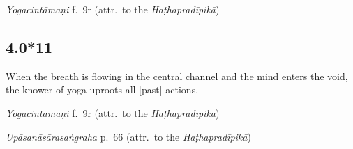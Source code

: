 \begin{ekdosis}

\begin{testimonia}[hp04_000_10]
\emph{Yogacintāmaṇi} f.~9r (attr.~to the \emph{Haṭhapradīpikā})
\begin{versinnote}
\end{versinnote}
\end{testimonia}



\subsection*{4.0*11}
\begin{translation}[hp04_000_11]
When the breath is flowing in the central channel and the mind enters the void, the knower of yoga uproots all [past] actions.
\end{translation}

\begin{sources}[hp04_000_11]
\end{sources}

\begin{testimonia}[hp04_000_11]
\emph{Yogacintāmaṇi} f.~9r (attr.~to the \emph{Haṭhapradīpikā})
\begin{versinnote}
\end{versinnote}

\emph{Upāsanāsārasaṅgraha} p.~66 (attr.~to the \emph{Haṭhapradīpikā})
\begin{versinnote}
\end{versinnote}
\end{testimonia}



\end{ekdosis}
